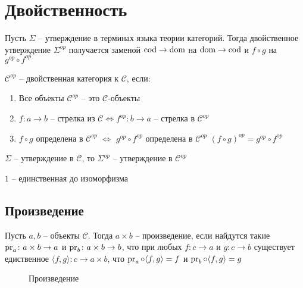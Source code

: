 \section{Двойственность}

\begin{defn}
  Пусть $\Sigma$ -- утверждение в терминах языка теории категорий.
  Тогда двойственное утверждение $\Sigma^{op}$ получается заменой
  $\operatorname{cod} \to \operatorname{dom}$ на $\operatorname{dom} \to \operatorname{cod}$ и $f \circ g$ на $g^{op} \circ f^{op}$
\end{defn}

\begin{defn}
  $\mathcal{C}^{op}$ -- двойственная категория к $\mathcal{C}$, если:
  \begin{enumerate}
    \item Все объекты $\mathcal{C}^{op}$ -- это $\mathcal{C}$-объекты
    \item $f \colon a \to b$ -- стрелка из $\mathcal{C} \iff f^{op}
      \colon b \to a$ -- стрелка в $\mathcal{C}^{op}$
    \item $f \circ g$ определена в $\mathcal{C}^{op}$ $\iff$ $g^{op} \circ
      f^{op}$ определена в $\mathcal{C}^{op}$
      $(f \circ g)^{op} = g^{op} \circ f^{op}$
  \end{enumerate}
\end{defn}

\begin{task}
  $\Sigma$ -- утверждение в $\mathcal{C}$, то $\Sigma^{op}$ -- утверждение в $\mathcal{C}^{op}$
\end{task}

\begin{task}
  $1$ -- единственная до изоморфизма
\end{task}

\subsection{Произведение}
\begin{defn}
  Пусть $a, b$ -- объекты $\mathcal{C}$. Тогда $a \times b$ -- произведение, если
  найдутся такие $\operatorname{pr}_a \colon a \times b \to a$ и $\operatorname{pr}_b \colon a \times b \to b$,
  что при любых $f \colon c \to a$ и $g \colon c \to b$ существует едиственное
  $\langle f, g \rangle \colon c \to a \times b$, что
  $\operatorname{pr}_a \circ \langle f, g \rangle = f$ и $\operatorname{pr}_b \circ \langle f, g \rangle = g$
\end{defn}

\begin{figure}[h]
  \centering
  
  \caption{Произведение}
  \label{fig:multiplication}
\end{figure}


